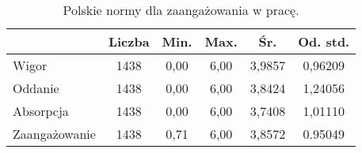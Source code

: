 \begin{table}[h!]
\begin{center}
\begin{tabular}{l | c c c c c}
  & Liczba & Min. & Max. & Śr. & Od. std. \\ \hline
Wigor & 1438 & 0,00 & 6,00 & 3,9857 & 0,96209 \\
Oddanie & 1438 &  0,00 & 6,00 & 3,8424 & 1,24056 \\
Absorpcja & 1438 & 0,00 & 6,00 & 3,7408 & 1,01110 \\ \hline
Zaangażowanie & 1438 & 0,71 & 6,00 & 3,8572 & 0.95049 \\
\end{tabular}
\end{center}
\caption{Polskie normy dla zaangażowania w pracę.}
\label{tab:uwes-pl-norms}
\end{table}


